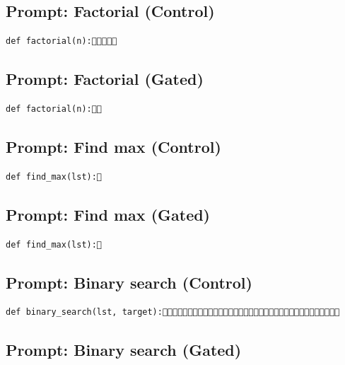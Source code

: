 
\subsection{Prompt: Factorial (Control)}
\label{sec:appendix_factorial__control_}

\begin{verbatim}
def factorial(n):
\end{verbatim}


\subsection{Prompt: Factorial (Gated)}
\label{sec:appendix_factorial__gated_}

\begin{verbatim}
def factorial(n):
\end{verbatim}


\subsection{Prompt: Find max (Control)}
\label{sec:appendix_find_max__control_}

\begin{verbatim}
def find_max(lst):
\end{verbatim}


\subsection{Prompt: Find max (Gated)}
\label{sec:appendix_find_max__gated_}

\begin{verbatim}
def find_max(lst):
\end{verbatim}


\subsection{Prompt: Binary search (Control)}
\label{sec:appendix_binary_search__control_}

\begin{verbatim}
def binary_search(lst, target):
\end{verbatim}


\subsection{Prompt: Binary search (Gated)}
\label{sec:appendix_binary_search__gated_}

